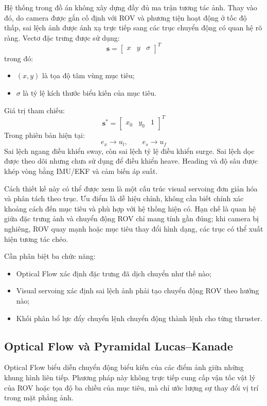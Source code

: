 \documentclass[../DoAn.tex]{subfiles}
\begin{document}
Hệ thống trong đồ án không xây dựng đầy đủ ma trận tương tác ảnh. Thay vào đó, do camera được gắn cố định với ROV và phương tiện hoạt động ở tốc độ thấp, sai lệch ảnh được ánh xạ trực tiếp sang các trục chuyển động có quan hệ rõ ràng. Vectơ đặc trưng được sử dụng:
\[
\mathbf{s} = 
\begin{bmatrix}
x & y & \sigma
\end{bmatrix}^{T}
\]
trong đó:
\begin{itemize}
    \item $(x, y)$ là tọa độ tâm vùng mục tiêu;
    \item $\sigma$ là tỷ lệ kích thước biểu kiến của mục tiêu.
\end{itemize}

Giá trị tham chiếu:
\[
\mathbf{s}^{*} = 
\begin{bmatrix}
x_0 & y_0 & 1
\end{bmatrix}^{T}
\]
Trong phiên bản hiện tại:
\[
e_x \rightarrow u_l, \qquad e_s \rightarrow u_f
\]
Sai lệch ngang điều khiển sway, còn sai lệch tỷ lệ điều khiển surge. Sai lệch dọc được theo dõi nhưng chưa sử dụng để điều khiển heave. Heading và độ sâu được khép vòng bằng IMU/EKF và cảm biến áp suất.

Cách thiết kế này có thể được xem là một cấu trúc visual servoing đơn giản hóa và phân tách theo trục. Ưu điểm là dễ hiệu chỉnh, không cần biết chính xác khoảng cách đến mục tiêu và phù hợp với hệ thống hiện có. Hạn chế là quan hệ giữa đặc trưng ảnh và chuyển động ROV chỉ mang tính gần đúng; khi camera bị nghiêng, ROV quay mạnh hoặc mục tiêu thay đổi hình dạng, các trục có thể xuất hiện tương tác chéo.

Cần phân biệt ba chức năng:
\begin{itemize}
    \item Optical Flow xác định đặc trưng đã dịch chuyển như thế nào;
    \item Visual servoing xác định sai lệch ảnh phải tạo chuyển động ROV theo hướng nào;
    \item Khối phân bổ lực đẩy chuyển lệnh chuyển động thành lệnh cho từng thruster.
\end{itemize}

\subsection{Optical Flow và Pyramidal Lucas--Kanade}

Optical Flow biểu diễn chuyển động biểu kiến của các điểm ảnh giữa những khung hình liên tiếp. Phương pháp này không trực tiếp cung cấp vận tốc vật lý của ROV hoặc tọa độ ba chiều của mục tiêu, mà chỉ ước lượng sự thay đổi vị trí trong mặt phẳng ảnh.
\end{document}
